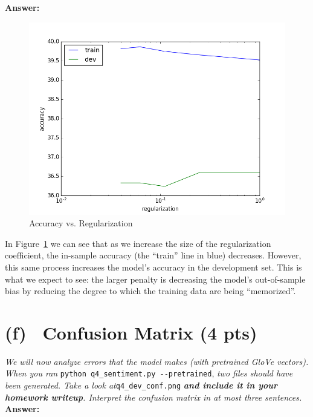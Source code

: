 \documentclass[fleqn]{MJD}
\newcommand{\subproblem}[2]{\section{(#1)~ #2}}
\newcommand{\0}{\emptyset}
\begin{document}
\noindent \textbf{Answer:}\\

\begin{figure}[!htbp]\centering
	\label{figure:acc_vs_reg}
	\caption{Accuracy vs. Regularization}
	\includegraphics[scale=0.7]{q4_reg_v_acc.png}
\end{figure}

\noindent In Figure~\ref{figure:acc_vs_reg} we can see that as we increase the size of the regularization coefficient, the in-sample accuracy (the ``train'' line in blue) decreases. However, this same process increases the model's accuracy in the development set. This is what we expect to see: the larger penalty is decreasing the model's out-of-sample bias by reducing the degree to which the training data are being ``memorized''. 


\newpage


\subproblem{f}{Confusion Matrix (4 pts)}
\textit{We will now analyze errors that the model makes (with pretrained GloVe vectors). When you ran} \newline\verb|python q4_sentiment.py --pretrained|, \textit{two files should have been generated. Take a look at}\newline \verb|q4_dev_conf.png| \textit{\textbf{and include it in your homework writeup}. Interpret the confusion matrix in at most three sentences.} \\


\textbf{Answer:}\\
\end{document}
